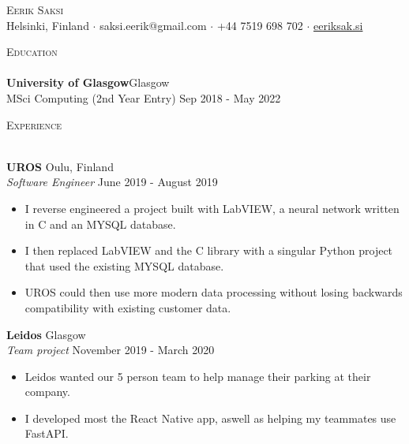 \documentclass[a4paper]{article}
\newcommand{\lineunder} {
    \vspace*{-8pt} \\
    \hspace*{-18pt} \hrulefill \\
}
\newcommand{\header} [1] {
    {\hspace*{-18pt}\vspace*{6pt} \textsc{#1}}
    \vspace*{-6pt} \lineunder
}
\begin{document}
\vspace*{-40pt}

    

\vspace*{-10pt}
\begin{center}
	{\Huge \scshape {Eerik Saksi}}\\
  Helsinki, Finland $\cdot$ saksi.eerik@gmail.com $\cdot$ +44 7519 698 702 $\cdot$ \url{eeriksak.si}  \\
\end{center}

\header{Education}
\textbf{University of Glasgow}\hfill Glasgow\\
    MSci Computing (2nd Year Entry) \hfill Sep 2018 - May 2022\\
\vspace{2mm}

\header{Experience}
\vspace{1mm}

\textbf{UROS} \hfill Oulu, Finland\\
\textit{Software Engineer} \hfill June 2019 - August 2019\\
\vspace{-1mm}
\begin{itemize} \itemsep 1pt
	\item I reverse engineered a project built with LabVIEW, a neural network written in C and an MYSQL database.
  \item I then replaced LabVIEW and the C library with a singular Python project that used the existing MYSQL database.
  \item UROS could then use more modern data processing without losing backwards compatibility with existing customer data.

\end{itemize}
\textbf{Leidos} \hfill Glasgow\\
\textit{Team project} \hfill November 2019 - March 2020\\
\vspace{-1mm}
\begin{itemize} \itemsep 1pt
	\item Leidos wanted our 5 person team to help manage their parking at their company.
  \item I developed most the React Native app, aswell as helping my teammates use FastAPI.
\end{itemize}
\end{document}
